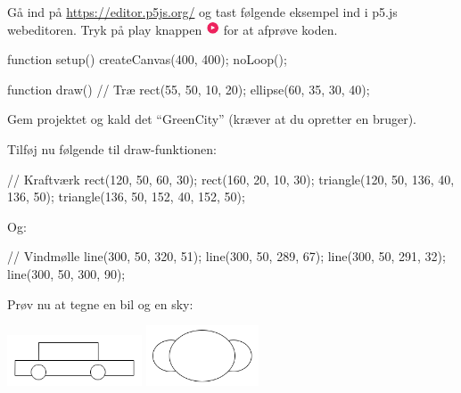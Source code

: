 \documentclass{ucph-handout}
\newcounter{handout}
\newcommand{\Ark}{Ark \#\arabic{handout} -- }
\begin{document}
\renewcommand{\Title}{\Ark Tegn med Processing.py}%
\begin{exercisebox}[adjusted title=Første program]
Gå ind på \url{https://editor.p5js.org/} og tast følgende eksempel ind
i p5.js webeditoren. Tryk på play knappen
\includegraphics[height=4mm]{../illustrations/images/play_p5js} for at afprøve
koden.

\begin{javascript} 
function setup() {
  createCanvas(400, 400);
  noLoop();
}

function draw() {
  // Træ
  rect(55, 50, 10, 20);
  ellipse(60, 35, 30, 40);
}
\end{javascript}

\noindent
Gem projektet og kald det ``GreenCity'' (kræver at du opretter en bruger).

\vspace{3mm}
\noindent
Tilføj nu følgende til draw-funktionen:
\begin{javascript}
// Kraftværk
rect(120, 50, 60, 30);
rect(160, 20, 10, 30);
triangle(120, 50, 136, 40, 136, 50);
triangle(136, 50, 152, 40, 152, 50);
\end{javascript}
Og:
\begin{javascript}
// Vindmølle
line(300, 50, 320, 51);
line(300, 50, 289, 67);
line(300, 50, 291, 32);
line(300, 50, 300, 90);
\end{javascript}

Prøv nu at tegne en bil og en sky:

\includegraphics[width=0.3\textwidth]{../illustrations/images/bil-streg.png}
\includegraphics[width=0.25\textwidth]{../illustrations/images/sky.png}
\end{exercisebox}
\end{document}
